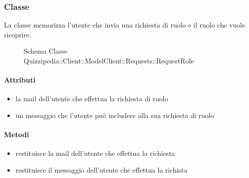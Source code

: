 \subsubsection{Classe }
La classe memorizza l'utente che invia una richiesta di ruolo e il ruolo che vuole ricoprire.
\begin{figure}[H]
\centering
\noindent{}
\caption[Schema Classe RequestRole]{Schema Classe Quizzipedia::Client::ModelClient::Requests::RequestRole}
\end{figure}
\paragraph{Attributi}
\begin{itemize}
\item {}
\newline
la mail dell'utente che effettua la richiesta di ruolo
\item {}
\newline
un messaggio che l'utente può includere alla sua richiesta di ruolo
\end{itemize}
\paragraph{Metodi}
\begin{itemize}
\item {}
\newline
restituisce la mail dell'utente che effettua la richiesta
\newline
\item {}
\newline
restituisce il messaggio dell'utente che effettua la richista
\newline
\end{itemize}
